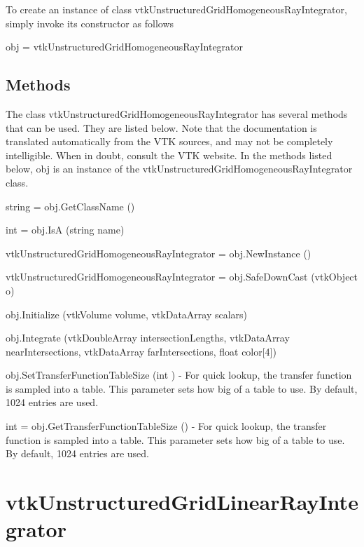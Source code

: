 To create an instance of class vtk\-Unstructured\-Grid\-Homogeneous\-Ray\-Integrator, simply invoke its constructor as follows \begin{DoxyVerb}  obj = vtkUnstructuredGridHomogeneousRayIntegrator
\end{DoxyVerb}
 \hypertarget{vtkwidgets_vtkxyplotwidget_Methods}{}\subsection{Methods}\label{vtkwidgets_vtkxyplotwidget_Methods}
The class vtk\-Unstructured\-Grid\-Homogeneous\-Ray\-Integrator has several methods that can be used. They are listed below. Note that the documentation is translated automatically from the V\-T\-K sources, and may not be completely intelligible. When in doubt, consult the V\-T\-K website. In the methods listed below, {\ttfamily obj} is an instance of the vtk\-Unstructured\-Grid\-Homogeneous\-Ray\-Integrator class. 
\begin{DoxyItemize}
\item {\ttfamily string = obj.\-Get\-Class\-Name ()}  
\item {\ttfamily int = obj.\-Is\-A (string name)}  
\item {\ttfamily vtk\-Unstructured\-Grid\-Homogeneous\-Ray\-Integrator = obj.\-New\-Instance ()}  
\item {\ttfamily vtk\-Unstructured\-Grid\-Homogeneous\-Ray\-Integrator = obj.\-Safe\-Down\-Cast (vtk\-Object o)}  
\item {\ttfamily obj.\-Initialize (vtk\-Volume volume, vtk\-Data\-Array scalars)}  
\item {\ttfamily obj.\-Integrate (vtk\-Double\-Array intersection\-Lengths, vtk\-Data\-Array near\-Intersections, vtk\-Data\-Array far\-Intersections, float color\mbox{[}4\mbox{]})}  
\item {\ttfamily obj.\-Set\-Transfer\-Function\-Table\-Size (int )} -\/ For quick lookup, the transfer function is sampled into a table. This parameter sets how big of a table to use. By default, 1024 entries are used.  
\item {\ttfamily int = obj.\-Get\-Transfer\-Function\-Table\-Size ()} -\/ For quick lookup, the transfer function is sampled into a table. This parameter sets how big of a table to use. By default, 1024 entries are used.  
\end{DoxyItemize}\hypertarget{vtkvolumerendering_vtkunstructuredgridlinearrayintegrator}{}\section{vtk\-Unstructured\-Grid\-Linear\-Ray\-Integrator}\label{vtkvolumerendering_vtkunstructuredgridlinearrayintegrator}
